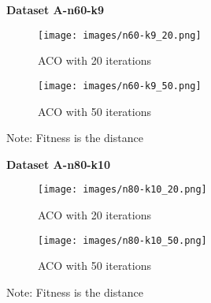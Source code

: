 \documentclass{article}
\begin{document}
\begin{figure}[H]
  \centering
  \textbf{Dataset A-n60-k9}
  \begin{subfigure}{.5\textwidth}
    \centering
    \texttt{[image: images/n60-k9\_20.png]}
    \caption{ACO with 20 iterations}
    \label{fig:n60-k9_20}
  \end{subfigure}%
  \begin{subfigure}{.5\textwidth}
    \centering
    \texttt{[image: images/n60-k9\_50.png]}
    \caption{ACO with 50 iterations}
    \label{fig:n60-k9_50}
  \end{subfigure}
  \caption{Note: Fitness is the distance}
  \label{fig:60-k9}
\end{figure}

\begin{figure}[H]
  \centering
  \textbf{Dataset A-n80-k10}
  \begin{subfigure}{.5\textwidth}
    \centering
    \texttt{[image: images/n80-k10\_20.png]}
    \caption{ACO with 20 iterations}
    \label{fig:n80-k10_20}
  \end{subfigure}%
  \begin{subfigure}{.5\textwidth}
    \centering
    \texttt{[image: images/n80-k10\_50.png]}
    \caption{ACO with 50 iterations}
    \label{fig:n80-k10_50}
  \end{subfigure}
  \caption{Note: Fitness is the distance}
  \label{fig:n80-k10}
\end{figure}
\end{document}

